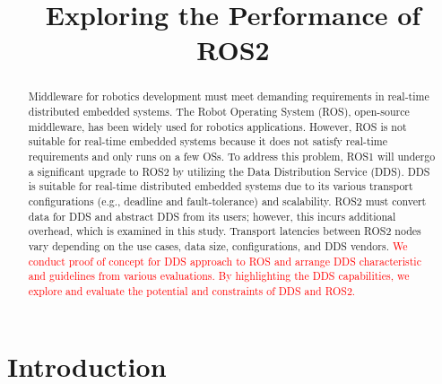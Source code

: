 \documentclass{sig-alternate-05-2015}
\title{Exploring the Performance of ROS2}
\begin{document}
\maketitle

\setcounter{topnumber}{5}%
\def\topfraction{1.00}%
\setcounter{bottomnumber}{5}%
\def\bottomfraction{1.00}%
\setcounter{totalnumber}{10}%
\def\textfraction{0.00}%


\begin{abstract}
  Middleware for robotics development must meet demanding requirements in real-time distributed embedded systems. 
  The Robot Operating System (ROS), open-source middleware, has been widely used for robotics applications.
  However, ROS is not suitable for real-time embedded systems because it does not satisfy real-time requirements and only runs on a few OSs.
  To address this problem, ROS1 will undergo a significant upgrade to ROS2 by utilizing the Data Distribution Service (DDS).
  DDS is suitable for real-time distributed embedded systems due to its various transport configurations (e.g., deadline and fault-tolerance) and scalability.
  ROS2 must convert data for DDS and abstract DDS from its users; however, this incurs additional overhead, which is examined in this study.
  Transport latencies between ROS2 nodes vary depending on the use cases, data size, configurations, and DDS vendors.
  \textcolor{red}{We conduct proof of concept for DDS approach to ROS and arrange DDS characteristic and guidelines from various evaluations.
  By highlighting the DDS capabilities, we explore and evaluate the potential and constraints of DDS and ROS2.}
\end{abstract}

\vspace{-2mm}

\vspace{-3mm}
\section{Introduction}
\label{sec:orgheadline5}
\end{document}
